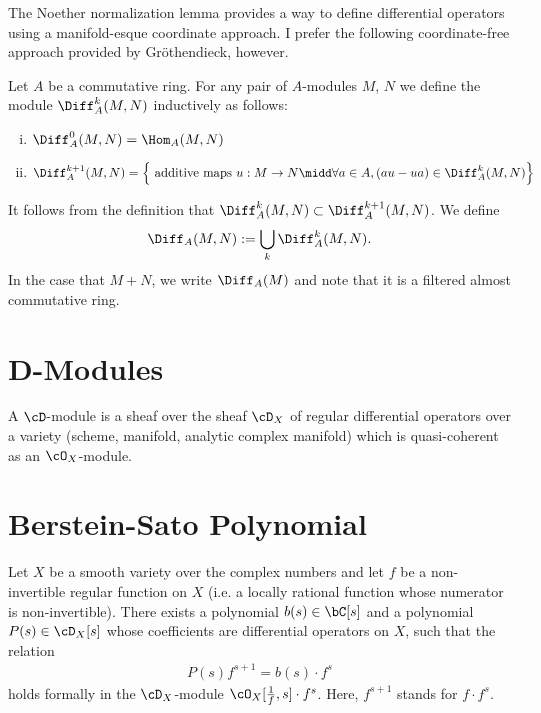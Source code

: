 \begin{rmk}\label{rmk:Noeth-Norm-gives-coord-def-of-diff-op}
	The Noether normalization lemma provides a way to define differential operators using a manifold-esque coordinate approach. I prefer the following coordinate-free approach provided by Gr\"othendieck, however.
\end{rmk}
\begin{defn}\label{defn:diff-ops}
	Let $A$ be a commutative ring. For any pair of $A$-modules $M$, $N$ we define the module $\Diff_A^{k}(M,N)$ inductively as follows:
	\begin{enumerate}[(i)]
		\item $\Diff_A^{0}(M,N) = \Hom_A(M,N)$
		\item $\Diff_A^{k+1}(M,N) = \left\{\text{ additive maps } u:M\to N \midd \forall a \in A, (a u - u a) \in \Diff^{k}_A(M,N)\right\}$
	\end{enumerate}
	It follows from the definition that $\Diff_{A}^{k}(M,N) \subset \Diff_A^{k+1}(M,N)$. We define
	\begin{align*}
		\Diff_A(M,N) := \bigcup_{k} \Diff_A^k(M,N).
	\end{align*}
	In the case that $M + N$, we write $\Diff_A(M)$ and note that it is a filtered almost commutative ring.
\end{defn}

\section{D-Modules}
\begin{defn}\label{def:D-modules}
	A $\cD$-module is a sheaf over the sheaf $\cD_X$ of regular differential operators over a variety (scheme, manifold, analytic complex manifold) which is quasi-coherent as an $\cO_X$-module.
\end{defn}


\section{Berstein-Sato Polynomial}
\begin{thm}\label{thm:b-function-theorem}
	Let $X$ be a smooth variety over the complex numbers and let $f$ be a non-invertible regular function on $X$ (i.e. a locally rational function whose numerator is non-invertible). There exists a polynomial $b(s) \in \bC[s]$ and a polynomial $P(s) \in \cD_X[s]$ whose coefficients are differential operators on $X$, such that the relation
	\begin{align*}
		P(s)f^{s+1} = b(s)\cdot f^s
	\end{align*}
	holds formally in the $\cD_X$-module $\cO_X[\frac{1}{f},s] \cdot f^s$. Here, $f^{s+1}$ stands for $f\cdot f^s$.
\end{thm}


